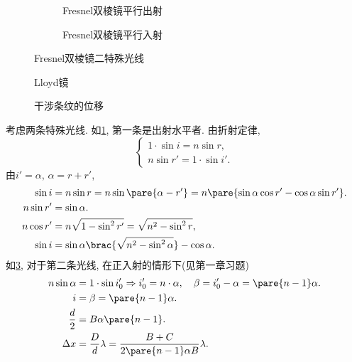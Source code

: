 \documentclass{ctexart}
\begin{document}
\begin{figure}[ht]
    \centering
    \begin{subfigure}{.47\textwidth}
        \centering
        \caption{Fresnel双棱镜平行出射}
        \label{fig:Fresnel双棱镜平行出射}
    \end{subfigure}
    \begin{subfigure}{.47\textwidth}
        \centering
        \caption{Fresnel双棱镜平行入射}
        \label{fig:Fresnel双棱镜平行入射}
    \end{subfigure}
    \caption{Fresnel双棱镜二特殊光线}
\end{figure}
\begin{figure}[ht]
    \centering
    \caption{Lloyd镜}
\end{figure}
\begin{figure}
    \centering
    \caption{干涉条纹的位移}
\end{figure}

考虑两条特殊光线. 如\cref{fig:Fresnel双棱镜平行出射}, 第一条是出射水平者. 由折射定律,
\[ \begin{cases}
    1\cdot \sin i = n\sin r,\\
    n\sin r' = 1\cdot \sin i'.
\end{cases} \]
由$i' =\alpha$, $\alpha = r+r'$,
\begin{align*}
    \sin i &= n\sin r = n\sin\pare{\alpha - r'} = n\pare{\sin\alpha\cos r' - \cos\alpha\sin r'}. \\
    n\sin r' &= \sin \alpha. \\
    n\cos r' &= n\sqrt{1-\sin^2 r'} = \sqrt{n^2 - \sin^2 r}, \\
    \sin i &= \sin \alpha \brac{\sqrt{n^2 - \sin^2\alpha}} - \cos\alpha.
\end{align*}
如\cref{fig:Fresnel双棱镜平行入射}, 对于第二条光线, 在正入射的情形下(见第一章习题)
\begin{align*}
    n\sin \alpha& = 1\cdot \sin i'_0\Rightarrow i'_0 = n\cdot\alpha,\quad \beta = i'_0 - \alpha = \pare{n-1}\alpha. \\
    i &= \beta = \pare{n-1}\alpha. \\
    \frac{d}{2} &= B\alpha \pare{n-1}. \\
    \Delta x &= \frac{D}{d}\lambda = \frac{B+C}{2\pare{n-1}\alpha B}\lambda.
\end{align*}
\end{document}
